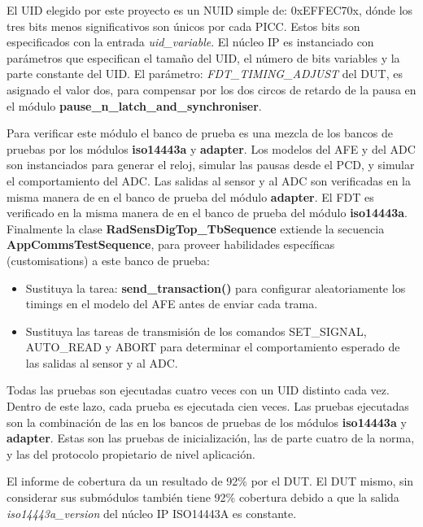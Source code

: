 \documentclass[a4paper, twoside, 11pt]{report}
\begin{document}
El UID elegido por este proyecto es un NUID simple de: 0xEFFEC70x, dónde los tres bits menos significativos son únicos por cada PICC. Estos bits son especificados con la entrada \textit{uid\_variable}. El núcleo IP es instanciado con parámetros que especifican el tamaño del UID, el número de bits variables y la parte constante del UID. El parámetro: \textit{FDT\_TIMING\_ADJUST} del DUT, es asignado el valor dos, para compensar por los dos circos de retardo de la pausa en el módulo \textbf{pause\_n\_latch\_and\_synchroniser}.

Para verificar este módulo el banco de prueba es una mezcla de los bancos de pruebas por los módulos \textbf{iso14443a} y \textbf{adapter}. Los modelos del AFE y del ADC son instanciados para generar el reloj, simular las pausas desde el PCD, y simular el comportamiento del ADC. Las salidas al sensor y al ADC son verificadas en la misma manera de en el banco de prueba del módulo \textbf{adapter}. El FDT es verificado en la misma manera de en el banco de prueba del módulo \textbf{iso14443a}. Finalmente la clase \textbf{RadSensDigTop\_TbSequence} extiende la secuencia \textbf{AppCommsTestSequence}, para proveer habilidades específicas (customisations) a este banco de prueba:

\begin{itemize}
  \item Sustituya la tarea: \textbf{send\_transaction()} para configurar aleatoriamente los timings en el modelo del AFE antes de enviar cada trama.
  \item Sustituya las tareas de transmisión de los comandos SET\_SIGNAL, AUTO\_READ y ABORT para determinar el comportamiento esperado de las salidas al sensor y al ADC.
\end{itemize}

Todas las pruebas son ejecutadas cuatro veces con un UID distinto cada vez. Dentro de este lazo, cada prueba es ejecutada cien veces. Las pruebas ejecutadas son la combinación de las en los bancos de pruebas de los módulos \textbf{iso14443a} y \textbf{adapter}. Estas son las pruebas de inicialización, las de parte cuatro de la norma, y las del protocolo propietario de nivel aplicación.

El informe de cobertura da un resultado de 92\% por el DUT. El DUT mismo, sin considerar sus submódulos también tiene 92\% cobertura debido a que la salida \textit{iso14443a\_version} del núcleo IP ISO14443A es constante.

\end{document}
